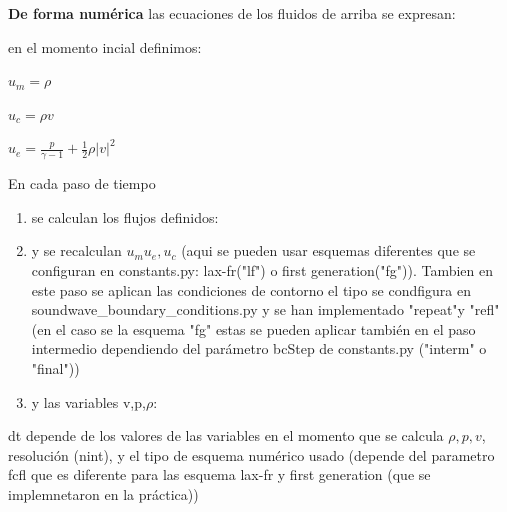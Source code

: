 \documentclass{article}
\begin{document}
\textbf{ De forma numérica} las ecuaciones de los fluidos de arriba se expresan: 
\begin{description}  
\item en el momento incial definimos:
\item $u_m = \rho$
\item $u_c = \rho v$
\item $u_e = \frac{p}{\gamma - 1} + \frac{1}{2}  \rho  |v|^2 $
\item En cada paso de tiempo
\begin{enumerate}  
\item se calculan los flujos definidos:
\item y se recalculan $u_m u_e, u_c$ (aqui se pueden usar esquemas diferentes que se configuran en constants.py: lax-fr("lf") o first generation("fg")). 
Tambien en este paso se aplican las condiciones de contorno el tipo se condfigura en soundwave\_boundary\_conditions.py 
y se han implementado "repeat"y "refl" (en el caso se la esquema "fg" estas se pueden aplicar también en el paso 
intermedio dependiendo del parámetro bcStep de constants.py ("interm" o "final"))


\item y las variables v,p,$\rho$:
\end{enumerate}  
\item dt depende de los valores de las variables en el momento que se calcula $\rho, p, v$, resolución (nint), y el tipo de esquema numérico usado (depende del parametro fcfl que es diferente para las esquema lax-fr y first generation (que se implemnetaron en la práctica))
 


\end{description}  
\end{document}
